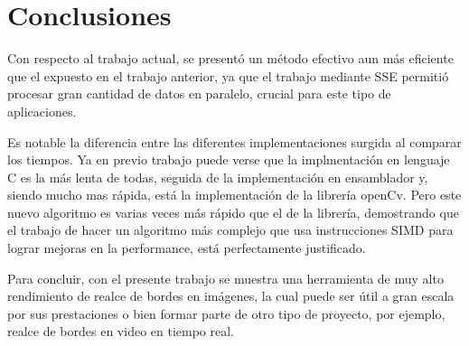 
\section{Conclusiones}

Con respecto al trabajo actual, se present\'o un m\'etodo efectivo aun m\'as  eficiente que el expuesto en el trabajo anterior, ya que el trabajo mediante SSE permiti\'o procesar gran cantidad de datos en paralelo, crucial para este tipo de aplicaciones.


	Es notable la diferencia entre las diferentes implementaciones surgida al comparar los tiempos. Ya en previo trabajo puede verse que la implmentaci\'on en lenguaje C es la m\'as lenta de todas, seguida de la implementaci\'on en ensamblador y, siendo mucho mas r\'apida, está la implementaci\'on de la librer\'ia openCv. Pero este nuevo algoritmo es varias veces m\'as r\'apido que el de la librer\'ia, demostrando que el trabajo de hacer un algoritmo más complejo que usa instrucciones SIMD para lograr mejoras en la performance, está perfectamente justificado. 

	Para concluir, con el presente trabajo se muestra una herramienta de muy alto rendimiento de realce de bordes en im\'agenes, la cual puede ser \'util a gran escala por sus prestaciones o bien formar parte de otro tipo de proyecto, por ejemplo, realce de bordes en video en tiempo real.

\pagebreak	

